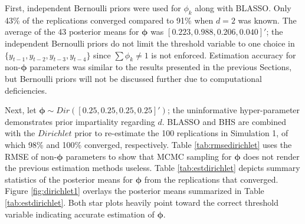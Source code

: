 First, independent Bernoulli priors were used for $\phi_k$ along with BLASSO. Only 43\% of the replications converged compared to 91\% when $d=2$ was known. The average of the 43 posterior means for $\bm{\phi}$ was $[0.223,0.988,0.206,0.040]'$; the independent Bernoulli priors do not limit the threshold variable to one choice in  $\{y_{t-1},y_{t-2},y_{t-3},y_{t-4}\}$ since $\sum \phi_k \neq 1$ is not enforced. Estimation accuracy for non-$\bm{\phi}$ parameters was similar to the results presented in the previous Sections, but Bernoulli priors will not be discussed further due to computational deficiencies.

Next, let $\bm{\phi}\sim Dir([0.25,0.25,0.25,0.25]')$; the uninformative hyper-parameter demonstrates prior impartiality regarding $d$. BLASSO and BHS are combined with the $Dirichlet$ prior to re-estimate the 100 replications in Simulation 1, of which 98\% and 100\% converged, respectively. Table \ref{tab:rmsedirichlet} uses the RMSE of non-$\bm{\phi}$ parameters to show that MCMC sampling for $\bm{\phi}$ does not render the previous estimation methods useless. Table \ref{tab:estdirichlet} depicts summary statistics of the posterior means for $\bm{\phi}$ from the replications that converged. Figure \ref{fig:dirichlet1} overlays the posterior means summarized in Table \ref{tab:estdirichlet}. Both star plots heavily point toward the correct threshold variable indicating accurate estimation of $\bm{\phi}$. 
 
